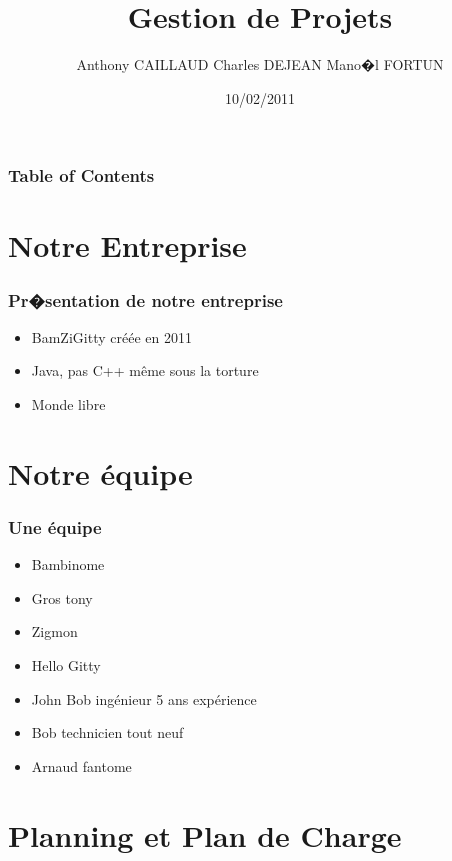 \documentclass{beamer}
\title{Gestion de Projets}
\author{Anthony CAILLAUD Charles DEJEAN Mano�l FORTUN}
\date{10/02/2011}
\begin{document}
\begin{frame}
\titlepage
\end{frame}



\begin{frame}
\frametitle{Table of Contents}
\tableofcontents[hideallsubsections]
\end{frame}

\section{Notre Entreprise}

\begin{frame}\frametitle{Pr�sentation de notre entreprise}

\begin{itemize}
\item BamZiGitty créée en 2011
\item Java, pas C++ même sous la torture
\item Monde libre
\end{itemize}


\end{frame}

\section{Notre équipe}
\begin{frame}\frametitle{Une équipe}

\begin{itemize}
\item Bambinome
\item Gros tony
\item Zigmon
\item Hello Gitty
\item John Bob ingénieur 5 ans expérience
\item Bob technicien tout neuf
\item Arnaud fantome
\end{itemize}


\end{frame}


\section{Planning et Plan de Charge}
\end{document}
